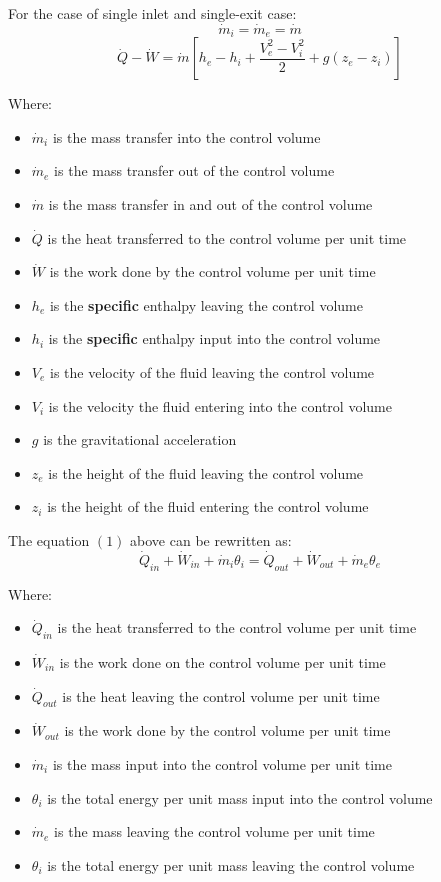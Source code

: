 \documentclass[11pt]{article}
\begin{document}
For the case of single inlet and single-exit case:
\[\dot{m}_i = \dot{m}_e = \dot{m}\]
\[\dot{Q} - \dot{W} = \dot{m} \left[h_e - h_i + \frac{V_e^2 - V_i^2}{2} + g(z_e - z_i) \right]\]

Where:
\begin{itemize}
\item \(\dot{m}_i\) is the mass transfer into the control volume
\item \(\dot{m}_e\) is the mass transfer out of the control volume
\item \(\dot{m}\) is the mass transfer in and out of the control volume
\item \(\dot{Q}\) is the heat transferred to the control volume per unit time
\item \(\dot{W}\) is the work done by the control volume per unit time
\item \(h_e\) is the \textbf{specific} enthalpy leaving the control volume
\item \(h_i\) is the \textbf{specific} enthalpy input into the control volume
\item \(V_e\) is the velocity of the fluid leaving the control volume
\item \(V_i\) is the velocity the fluid entering into the control volume
\item \(g\) is the gravitational acceleration
\item \(z_e\) is the height of the fluid leaving the control volume
\item \(z_i\) is the height of the fluid entering the control volume
\end{itemize}

\newpage

The equation \((1)\) above can be rewritten as:
\[\dot{Q}_{in} + \dot{W}_{in} + \dot{m}_i \theta_i = \dot{Q}_{out} + \dot{W}_{out} + \dot{m}_e \theta_e\]

Where:
\begin{itemize}
\item \(\dot{Q}_{in}\) is the heat transferred to the control volume per unit time
\item \(\dot{W}_{in}\) is the work done on the control volume per unit time
\item \(\dot{Q}_{out}\) is the heat leaving the control volume per unit time
\item \(\dot{W}_{out}\) is the work done by the control volume per unit time
\item \(\dot{m}_i\) is the mass input into the control volume per unit time
\item \(\theta_i\) is the total energy per unit mass input into the control volume
\item \(\dot{m}_e\) is the mass leaving the control volume per unit time
\item \(\theta_i\) is the total energy per unit mass leaving the control volume
\end{itemize}
\end{document}
